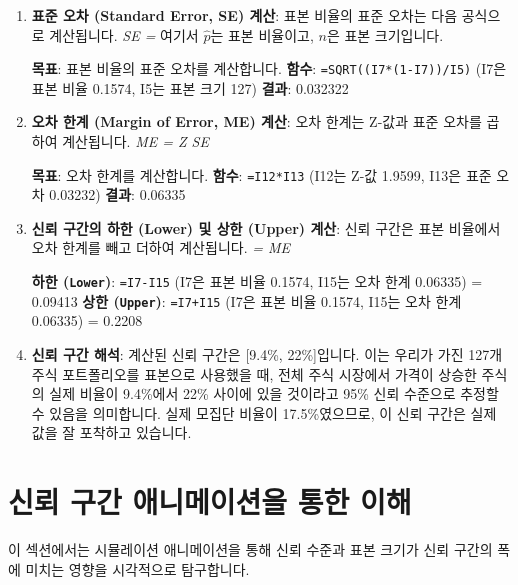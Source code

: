 \documentclass[11pt,a4paper]{book}
\newcommand{\excel}[1]{\texttt{#1}}
\newcommand{\formula}[1]{\textit{#1}}
\theoremstyle{definition}
\begin{document}
\begin{enumerate}
    \item \textbf{표준 오차 (Standard Error, SE) 계산}:
    표본 비율의 표준 오차는 다음 공식으로 계산됩니다.
    \formula{SE = }
    여기서 $\hat{p}$는 표본 비율이고, $n$은 표본 크기입니다.
    \begin{examplebox}[title=Excel SQRT 함수를 이용한 표준 오차 계산]
        \textbf{목표}: 표본 비율의 표준 오차를 계산합니다.
        \textbf{함수}: \texttt{=SQRT((I7*(1-I7))/I5)} (I7은 표본 비율 0.1574, I5는 표본 크기 127)
        \textbf{결과}: 0.032322
    \end{examplebox}

    \item \textbf{오차 한계 (Margin of Error, ME) 계산}:
    오차 한계는 Z-값과 표준 오차를 곱하여 계산됩니다.
    \formula{ME = Z \times SE}
    \begin{examplebox}[title=Excel 오차 한계 계산]
        \textbf{목표}: 오차 한계를 계산합니다.
        \textbf{함수}: \texttt{=I12*I13} (I12는 Z-값 1.9599, I13은 표준 오차 0.03232)
        \textbf{결과}: 0.06335
    \end{examplebox}

    \item \textbf{신뢰 구간의 하한 (Lower) 및 상한 (Upper) 계산}:
    신뢰 구간은 표본 비율에서 오차 한계를 빼고 더하여 계산됩니다.
    \formula{ =  \pm ME}
    \begin{examplebox}[title=Excel 신뢰 구간 계산]
        \textbf{하한 (\excel{Lower})}: \texttt{=I7-I15} (I7은 표본 비율 0.1574, I15는 오차 한계 0.06335) = 0.09413
        \textbf{상한 (\excel{Upper})}: \texttt{=I7+I15} (I7은 표본 비율 0.1574, I15는 오차 한계 0.06335) = 0.2208
    \end{examplebox}

    \item \textbf{신뢰 구간 해석}:
    계산된 신뢰 구간은 [9.4\%, 22\%]입니다. 이는 우리가 가진 127개 주식 포트폴리오를 표본으로 사용했을 때, 전체 주식 시장에서 가격이 상승한 주식의 실제 비율이 9.4\%에서 22\% 사이에 있을 것이라고 95\% 신뢰 수준으로 추정할 수 있음을 의미합니다. 실제 모집단 비율이 17.5\%였으므로, 이 신뢰 구간은 실제 값을 잘 포착하고 있습니다.
\end{enumerate}


\section{신뢰 구간 애니메이션을 통한 이해}
이 섹션에서는 시뮬레이션 애니메이션을 통해 신뢰 수준과 표본 크기가 신뢰 구간의 폭에 미치는 영향을 시각적으로 탐구합니다.
\end{document}
